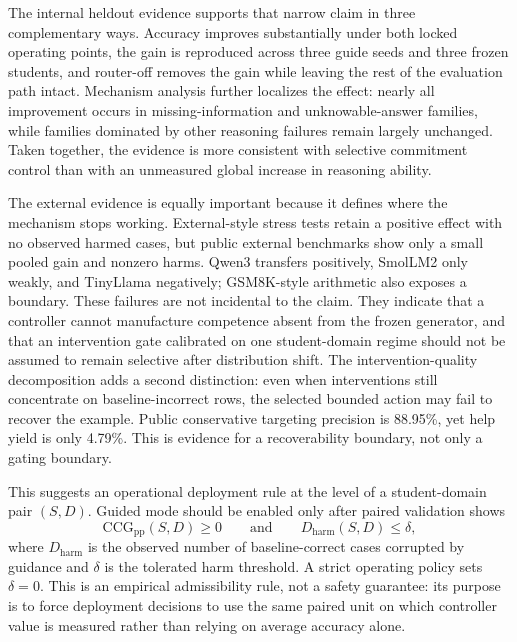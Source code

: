 \documentclass[11pt]{article}
\begin{document}
The internal heldout evidence supports that narrow claim in three complementary ways. Accuracy improves substantially under both locked operating points, the gain is reproduced across three guide seeds and three frozen students, and router-off removes the gain while leaving the rest of the evaluation path intact. Mechanism analysis further localizes the effect: nearly all improvement occurs in missing-information and unknowable-answer families, while families dominated by other reasoning failures remain largely unchanged. Taken together, the evidence is more consistent with selective commitment control than with an unmeasured global increase in reasoning ability.

The external evidence is equally important because it defines where the mechanism stops working. External-style stress tests retain a positive effect with no observed harmed cases, but public external benchmarks show only a small pooled gain and nonzero harms. Qwen3 transfers positively, SmolLM2 only weakly, and TinyLlama negatively; GSM8K-style arithmetic also exposes a boundary. These failures are not incidental to the claim. They indicate that a controller cannot manufacture competence absent from the frozen generator, and that an intervention gate calibrated on one student-domain regime should not be assumed to remain selective after distribution shift. The intervention-quality decomposition adds a second distinction: even when interventions still concentrate on baseline-incorrect rows, the selected bounded action may fail to recover the example. Public conservative targeting precision is 88.95\%, yet help yield is only 4.79\%. This is evidence for a recoverability boundary, not only a gating boundary.

This suggests an operational deployment rule at the level of a student-domain pair \((S,D)\). Guided mode should be enabled only after paired validation shows
\begin{equation}
\mathrm{CCG}_{\mathrm{pp}}(S,D) \geq 0
\qquad\text{and}\qquad
D_{\mathrm{harm}}(S,D) \leq \delta,
\end{equation}
where \(D_{\mathrm{harm}}\) is the observed number of baseline-correct cases corrupted by guidance and \(\delta\) is the tolerated harm threshold. A strict operating policy sets \(\delta=0\). This is an empirical admissibility rule, not a safety guarantee: its purpose is to force deployment decisions to use the same paired unit on which controller value is measured rather than relying on average accuracy alone.
\end{document}
